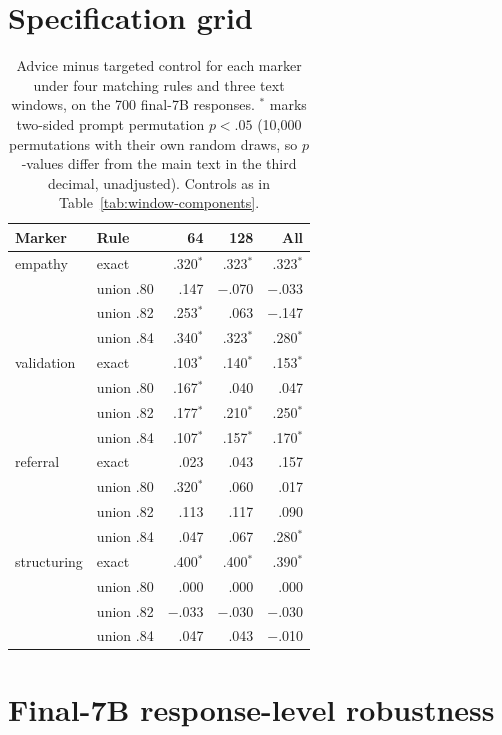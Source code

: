\documentclass[11pt]{article}
\begin{document}
\section{Specification grid}
\label{app:grid}
\begin{table}[h]
\centering
\small
\setlength{\tabcolsep}{4pt}
\begin{tabular}{llrrr}
\toprule
Marker & Rule & 64 & 128 & All \\
\midrule
empathy & exact & .320$^{*}$ & .323$^{*}$ & .323$^{*}$ \\
 & union .80 & .147 & $-$.070 & $-$.033 \\
 & union .82 & .253$^{*}$ & .063 & $-$.147 \\
 & union .84 & .340$^{*}$ & .323$^{*}$ & .280$^{*}$ \\
\addlinespace
validation & exact & .103$^{*}$ & .140$^{*}$ & .153$^{*}$ \\
 & union .80 & .167$^{*}$ & .040 & .047 \\
 & union .82 & .177$^{*}$ & .210$^{*}$ & .250$^{*}$ \\
 & union .84 & .107$^{*}$ & .157$^{*}$ & .170$^{*}$ \\
\addlinespace
referral & exact & .023 & .043 & .157 \\
 & union .80 & .320$^{*}$ & .060 & .017 \\
 & union .82 & .113 & .117 & .090 \\
 & union .84 & .047 & .067 & .280$^{*}$ \\
\addlinespace
structuring & exact & .400$^{*}$ & .400$^{*}$ & .390$^{*}$ \\
 & union .80 & .000 & .000 & .000 \\
 & union .82 & $-$.033 & $-$.030 & $-$.030 \\
 & union .84 & .047 & .043 & $-$.010 \\
\bottomrule
\end{tabular}
\caption{Advice minus targeted control for each marker under four matching
rules and three text windows, on the 700 final-7B responses. $^{*}$ marks two-sided
prompt permutation $p<.05$ (10{,}000 permutations with their own random
draws, so $p$-values differ from the main text in the third decimal,
unadjusted). Controls as
in Table~\ref{tab:window-components}.}
\label{tab:grid}
\end{table}

\section{Final-7B response-level robustness}
\label{app:response-robustness}
\end{document}
